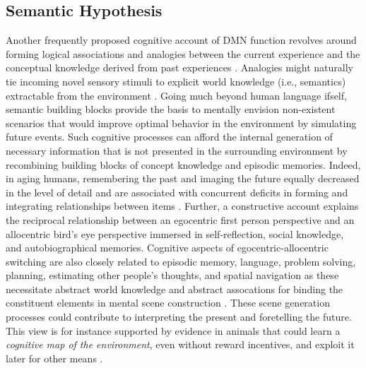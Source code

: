 \documentclass{article} %
\begin{document}
\subsection{Semantic Hypothesis}
Another frequently proposed cognitive account of DMN function revolves
around forming logical associations and analogies between
the current experience and
the conceptual knowledge derived from past experiences
\citep{bar2007proactive, binder1999conceptual}.
Analogies might naturally tie incoming novel sensory stimuli to
explicit world knowledge (i.e., semantics) extractable from the environment
\citep{bar2009proactive}.
%
Going much beyond human language ifself,
semantic building blocks provide the basis to mentally envision non-existent scenarios
that would improve optimal behavior in the environment
by simulating future events.
Such cognitive processes can afford
the internal generation of necessary information
that is not presented in the surrounding environment
by recombining building blocks of
concept knowledge and episodic memories.
Indeed, in aging humans, remembering the past and imaging the future
equally decreased in the level of detail and are associated with
concurrent deficits in forming and integrating relationships between
items \citep{addis2008age, spreng2006temporal}.
Further,
a constructive account explains the reciprocal relationship
between an egocentric first person perspective and
an allocentric bird’s eye perspective immersed in
self-reflection, social knowledge, and autobiographical memories.
%
Cognitive aspects of egocentric-allocentric switching
are also closely related to episodic memory, language, problem solving,
planning, estimating other people's thoughts, and spatial navigation
as these necessitate abstract world knowledge and abstract assocations
for binding the constituent elements in mental scene construction
\citep{schacter2007remembering}.
These scene generation processes could contribute to interpreting the
present and foretelling the future.
This view is for instance supported by evidence in animals that
could learn a \textit{cognitive map of the environment},
even without reward incentives, and exploit it later
for other means \citep{tolman1948cognitive}.
\end{document}
